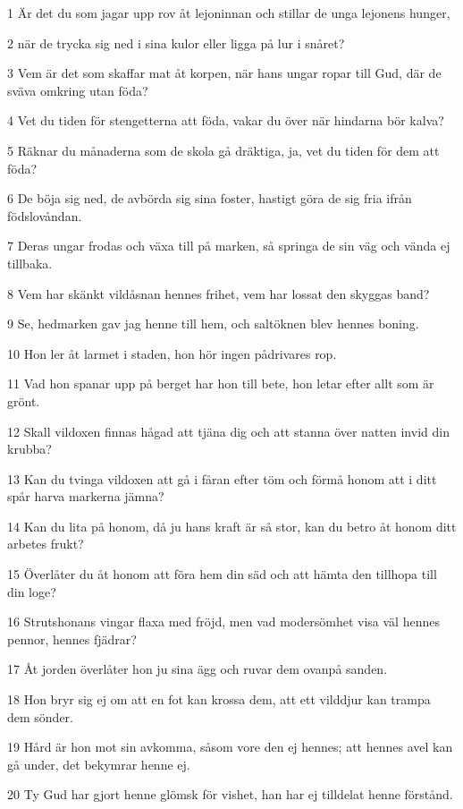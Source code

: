 \par 1 Är det du som jagar upp rov åt lejoninnan och stillar de unga lejonens hunger,
\par 2 när de trycka sig ned i sina kulor eller ligga på lur i snåret?
\par 3 Vem är det som skaffar mat åt korpen, när hans ungar ropar till Gud, där de sväva omkring utan föda?
\par 4 Vet du tiden för stengetterna att föda, vakar du över när hindarna bör kalva?
\par 5 Räknar du månaderna som de skola gå dräktiga, ja, vet du tiden för dem att föda?
\par 6 De böja sig ned, de avbörda sig sina foster, hastigt göra de sig fria ifrån födslovåndan.
\par 7 Deras ungar frodas och växa till på marken, så springa de sin väg och vända ej tillbaka.
\par 8 Vem har skänkt vildåsnan hennes frihet, vem har lossat den skyggas band?
\par 9 Se, hedmarken gav jag henne till hem, och saltöknen blev hennes boning.
\par 10 Hon ler åt larmet i staden, hon hör ingen pådrivares rop.
\par 11 Vad hon spanar upp på berget har hon till bete, hon letar efter allt som är grönt.
\par 12 Skall vildoxen finnas hågad att tjäna dig och att stanna över natten invid din krubba?
\par 13 Kan du tvinga vildoxen att gå i fåran efter töm och förmå honom att i ditt spår harva markerna jämna?
\par 14 Kan du lita på honom, då ju hans kraft är så stor, kan du betro åt honom ditt arbetes frukt?
\par 15 Överlåter du åt honom att föra hem din säd och att hämta den tillhopa till din loge?
\par 16 Strutshonans vingar flaxa med fröjd, men vad modersömhet visa väl hennes pennor, hennes fjädrar?
\par 17 Åt jorden överlåter hon ju sina ägg och ruvar dem ovanpå sanden.
\par 18 Hon bryr sig ej om att en fot kan krossa dem, att ett vilddjur kan trampa dem sönder.
\par 19 Hård är hon mot sin avkomma, såsom vore den ej hennes; att hennes avel kan gå under, det bekymrar henne ej.
\par 20 Ty Gud har gjort henne glömsk för vishet, han har ej tilldelat henne förstånd.
